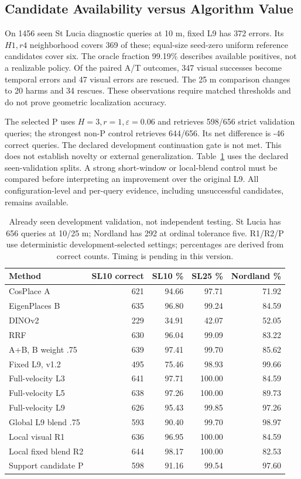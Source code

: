 \documentclass[conference]{IEEEtran}
\begin{document}
\subsection{Candidate Availability versus Algorithm Value}
On 1456 seen St Lucia diagnostic queries at 10 m, fixed L9 has 372 errors. Its $H1,r4$ neighborhood covers 369 of these; equal-size seed-zero uniform reference candidates cover six. The oracle fraction 99.19\% describes available positives, not a realizable policy. Of the paired A/T outcomes, 347 visual successes become temporal errors and 47 visual errors are rescued. The 25 m comparison changes to 20 harms and 34 rescues. These observations require matched thresholds and do not prove geometric localization accuracy.

The selected P uses $H=3,r=1,\varepsilon=0.06$ and retrieves 598/656 strict validation queries; the strongest non-P control retrieves 644/656. Its net difference is -46 correct queries. The declared development continuation gate is not met. This does not establish novelty or external generalization. Table~\ref{tab:main} uses the declared seen-validation splits. A strong short-window or local-blend control must be compared before interpreting an improvement over the original L9. All configuration-level and per-query evidence, including unsuccessful candidates, remains available.

\begin{table}[t]\centering\small
\caption{Already seen development validation, not independent testing. St Lucia has 656 queries at 10/25 m; Nordland has 292 at ordinal tolerance five. R1/R2/P use deterministic development-selected settings; percentages are derived from correct counts. Timing is pending in this version.}\label{tab:main}
\begin{tabular}{lrrrr}\toprule
Method & SL10 correct & SL10 \% & SL25 \% & Nordland \% \\\midrule
CosPlace A & 621 & 94.66 & 97.71 & 71.92\\
EigenPlaces B & 635 & 96.80 & 99.24 & 84.59\\
DINOv2 & 229 & 34.91 & 42.07 & 52.05\\
RRF & 630 & 96.04 & 99.09 & 83.22\\
A+B, B weight .75 & 639 & 97.41 & 99.70 & 85.62\\
Fixed L9, v1.2 & 495 & 75.46 & 98.93 & 99.66\\
Full-velocity L3 & 641 & 97.71 & 100.00 & 84.59\\
Full-velocity L5 & 638 & 97.26 & 100.00 & 89.73\\
Full-velocity L9 & 626 & 95.43 & 99.85 & 97.26\\
Global L9 blend .75 & 593 & 90.40 & 99.70 & 98.97\\
Local visual R1 & 636 & 96.95 & 100.00 & 84.59\\
Local fixed blend R2 & 644 & 98.17 & 100.00 & 82.53\\
Support candidate P & 598 & 91.16 & 99.54 & 97.60\\
\bottomrule\end{tabular}\end{table}
\end{document}
